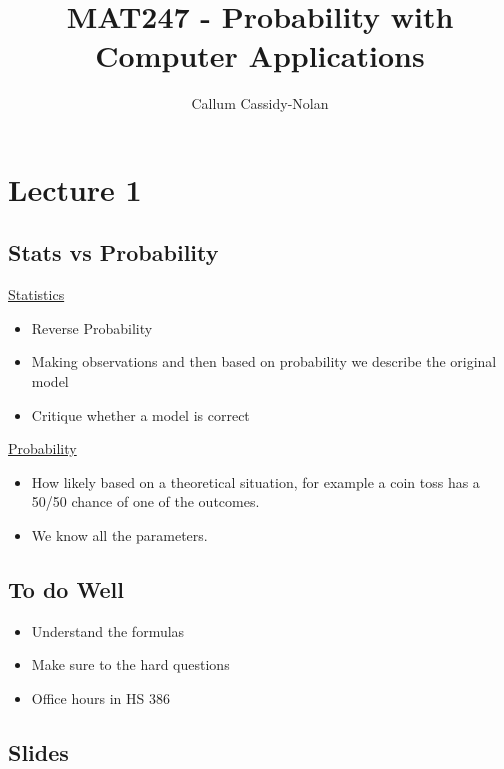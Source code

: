 \documentclass[11pt]{book}
\title{MAT247 - Probability with Computer Applications}
\author{Callum Cassidy-Nolan}
\begin{document}


\chapter{Lecture 1}%
\label{chp:lecture_1}

\section{Stats vs Probability}%
\label{sec:stats_vs_probability}

\underline{Statistics} 
\begin{itemize}
    \item Reverse Probability
    \item Making observations and then based on probability we describe the original model
    \item Critique whether a model is correct 
\end{itemize}
\underline{Probability} 
\begin{itemize}
    \item How likely based on a theoretical situation, for example a coin toss has a 50/50 chance of one of the outcomes.
    \item We know all the parameters.
\end{itemize}


\section{To do Well}%
\label{sec:to_do_well}

\begin{itemize}
    \item Understand the formulas
    \item Make sure to the hard questions
    \item Office hours in HS 386
\end{itemize}


\section{Slides}%
\label{sec:slides}




\end{document}
